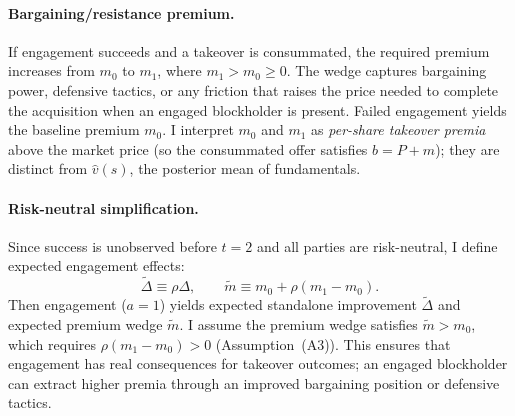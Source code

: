 \documentclass[11pt]{article}
\newcommand{\1}{\mathbf{1}}
\begin{document}
\paragraph{Bargaining/resistance premium.} If engagement succeeds and a takeover is consummated, the required premium increases from $m_0$ to $m_1$, where $m_1 > m_0 \geq 0$. The wedge captures bargaining power, defensive tactics, or any friction that raises the price needed to complete the acquisition when an engaged blockholder is present. Failed engagement yields the baseline premium $m_0$.
I interpret $m_0$ and $m_1$ as \emph{per-share takeover premia} above the market price (so the consummated offer satisfies $b=P+m$); they are distinct from $\hat{v}(s)$, the posterior mean of fundamentals.

\paragraph{Risk-neutral simplification.} Since success is unobserved before $t=2$ and all parties are risk-neutral, I define expected engagement effects:
\[
\tilde{\Delta} \equiv \rho \Delta, \qquad \tilde{m} \equiv m_0 + \rho(m_1 - m_0).
\]
Then engagement ($a=1$) yields expected standalone improvement $\tilde{\Delta}$ and expected premium wedge $\tilde{m}$. I assume the premium wedge satisfies $\tilde{m} > m_0$, which requires $\rho(m_1 - m_0) > 0$ (Assumption~\textup{(A3)}). This ensures that engagement has real consequences for takeover outcomes; an engaged blockholder can extract higher premia through an improved bargaining position or defensive tactics.
\end{document}

